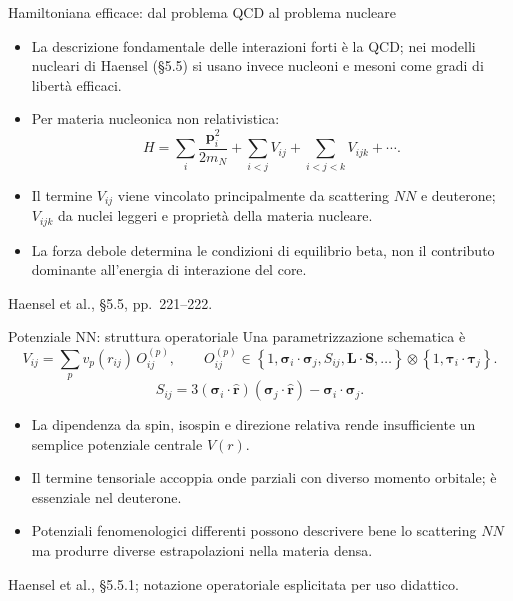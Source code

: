 \begin{frame}[t]{Hamiltoniana efficace: dal problema QCD al problema nucleare}
\small
\begin{itemize}
\item La descrizione fondamentale delle interazioni forti è la QCD; nei modelli nucleari di Haensel (§5.5) si usano invece nucleoni e mesoni come gradi di libertà efficaci.
\item Per materia nucleonica non relativistica:
\[
H=\sum_i\frac{\mathbf p_i^2}{2m_N}
+\sum_{i<j}V_{ij}+\sum_{i<j<k}V_{ijk}+\cdots.
\]
\item Il termine $V_{ij}$ viene vincolato principalmente da scattering $NN$ e deuterone; $V_{ijk}$ da nuclei leggeri e proprietà della materia nucleare.
\item La forza debole determina le condizioni di equilibrio beta, non il contributo dominante all'energia di interazione del core.
\end{itemize}
{\footnotesize Haensel et al., §5.5, pp.~221--222.}
\end{frame}

\begin{frame}[t]{Potenziale NN: struttura operatoriale}
\small
Una parametrizzazione schematica è
\[
V_{ij}=\sum_p v_p(r_{ij})\,O_{ij}^{(p)},\qquad
O_{ij}^{(p)}\in
\left\{1,\boldsymbol\sigma_i\!\cdot\!\boldsymbol\sigma_j,
S_{ij},\mathbf L\!\cdot\!\mathbf S,\ldots\right\}
\otimes\left\{1,\boldsymbol\tau_i\!\cdot\!\boldsymbol\tau_j\right\}.
\]
\[
S_{ij}=3(\boldsymbol\sigma_i\!\cdot\!\hat{\mathbf r})
(\boldsymbol\sigma_j\!\cdot\!\hat{\mathbf r})
-\boldsymbol\sigma_i\!\cdot\!\boldsymbol\sigma_j.
\]
\begin{itemize}
\item La dipendenza da spin, isospin e direzione relativa rende insufficiente un semplice potenziale centrale $V(r)$.
\item Il termine tensoriale accoppia onde parziali con diverso momento orbitale; è essenziale nel deuterone.
\item Potenziali fenomenologici differenti possono descrivere bene lo scattering $NN$ ma produrre diverse estrapolazioni nella materia densa.
\end{itemize}
{\footnotesize Haensel et al., §5.5.1; notazione operatoriale esplicitata per uso didattico.}
\end{frame}

